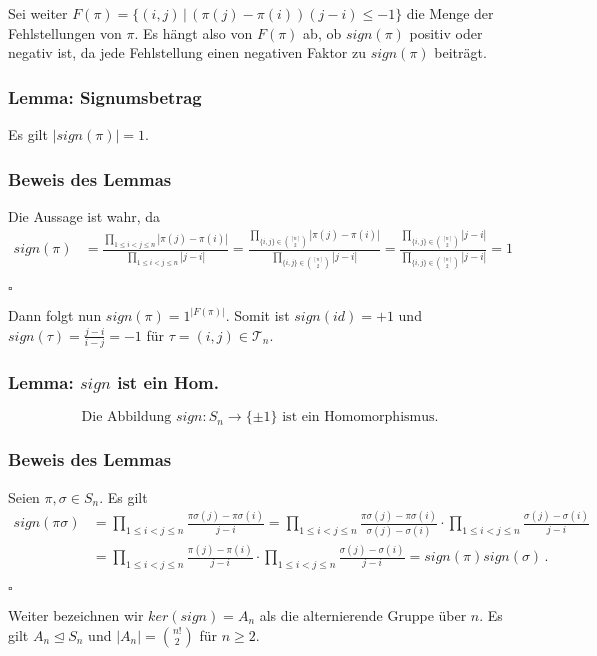 \documentclass[12pt, german]{article}
\newcommand\ddfrac[2]{\frac{\displaystyle #1}{\displaystyle #2}}
\newcommand{\bewiesen}{
	
	\begin{flushright}
		$\square$  \\
\end{flushright}}
\begin{document}
	Sei weiter $F(\pi) = \{(i,j)\, |\, (\pi(j) - \pi(i))(j-i) \leq -1\}$ die Menge der Fehlstellungen von $\pi$. 
	Es hängt also von $F(\pi)$ ab, ob $sign(\pi)$ positiv oder negativ ist, da jede Fehlstellung einen negativen Faktor zu $sign(\pi)$ beiträgt.
	
	\subsubsection{Lemma: Signumsbetrag}
	Es gilt $|sign(\pi) |= 1$.
	
	\subsubsection{Beweis des Lemmas}
	Die Aussage ist wahr, da 
	\begin{align*}
		sign(\pi) &= \ddfrac{\prod_{1 \leq i < j \leq n}  |\pi(j) - \pi(i)|}{\prod_{1 \leq i < j \leq n}  |j -i|} = \ddfrac{ \prod_{ \{i,j\} \in \binom{[n]}{2}} |\pi(j) - \pi(i)| }{ \prod_{ \{i,j\} \in \binom{[n]}{2}} |j - i|} = \ddfrac{ \prod_{ \{i,j\} \in \binom{[n]}{2}} |j - i| }{ \prod_{ \{i,j\} \in \binom{[n]}{2}} |j - i|} = 1
	\end{align*}
	\bewiesen
	
	Dann folgt nun $sign(\pi)= 1^{|F(\pi)|}$. 
	Somit ist $sign(id) = +1$ und $sign(\tau) = \frac{j-i}{i-j} = -1$ für $\tau= (i,j) \in \mathcal T_n$.
	
	
	\subsubsection{Lemma: $sign$ ist ein Hom.}
	$$ \text{Die Abbildung }sign: S_n \to \{ \pm 1\} \text{ ist ein Homomorphismus.}$$
	
	\subsubsection{Beweis des Lemmas}
	Seien $\pi, \sigma \in S_n$. Es gilt 
	\begin{align*}
		sign(\pi\sigma) &= \prod_{1 \leq i < j \leq n} \ddfrac{\pi\sigma(j) - \pi \sigma(i)}{j -i} = \prod_{1 \leq i < j \leq n} \ddfrac{\pi\sigma(j) - \pi \sigma(i)}{\sigma(j) -\sigma(i)} \cdot \prod_{1 \leq i < j \leq n}\ddfrac{\sigma(j) - \sigma(i)}{j -i}\\
		&= \prod_{1 \leq i < j \leq n} \ddfrac{\pi(j) - \pi (i)}{j -i} \cdot \prod_{1 \leq i < j \leq n}\ddfrac{\sigma(j) - \sigma(i)}{j -i} = sign(\pi) sign(\sigma)\, .
	\end{align*}
	\bewiesen
	Weiter bezeichnen wir $ker(sign) = A_n$ als die alternierende Gruppe über $n$.
	Es gilt $A_n \trianglelefteq S_n$ und $|A_n| = \binom{n!}{2}$ für $n \geq 2$. 
	
\end{document}
